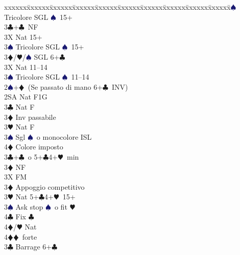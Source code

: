 \documentclass[a4paper,italian]{article}
\newcommand{\BC}{\textcolor{OliveGreen}{$\clubsuit$}}
\newcommand{\BD}{\textcolor{RedOrange}{$\vardiamondsuit$}}
\newcommand{\BH}{\textcolor{Red2}{$\varheartsuit${}}}
\newcommand{\BS}{\textcolor{MidnightBlue}{$\spadesuit${}}}
\newenvironment{bidtable}
{\begin{tabbing}

    xxxxxx\=xxxxxx\=xxxxxx\=xxxxxx\=xxxxxx\=xxxxxx\=xxxxxx\=xxxxxx\=xxxxxx\=xxxxxx\=\kill}
{\end{tabbing} }%
\begin{document}
\begin{multicols}{2}
\begin{bidtable}
                                            3\BS \> Tricolore SGL \BS\ 15+\-\\
                                            3\BC {}+\BC\ NF\+\\
                                            3X \> Nat 15+\\
                                            3\BS \> Tricolore SGL \BS\ 15+\-\\
                                            3\BD/\BH/\BS \> SGL 6+\BC \-\\
                                            3X \> Nat 11--14\\
                                            3\BS \> Tricolore SGL \BS\  11--14\-\\
                                            2\BS {}+\BD\ (Se passato di mano 6+\BC\ INV)\+\\
                                            2SA \> Nat F1G\+\\
                                            3\BC \> Nat F\\
                                            3\BD \> Inv passabile\\
                                            3\BH \> Nat F\\
                                            3\BS \> Sgl \BS\ o monocolore ISL\\
                                            4\BD \> Colore imposto\-\\
                                            3\BC {}+\BC\ o 5+\BC 4+\BH\ min\+\\
                                            3\BD \> NF\\
                                            3X \> FM\-\\
                                            3\BD \> Appoggio competitivo\\
                                            3\BH \> Nat 5+\BC 4+\BH\ 15+\+\\
                                            3\BS \> Ask stop \BS\ o fit \BH \\
                                            4\BC \> Fix \BC \\
                                            4\BD/\BH \> Nat\-\\
                                            4\BD {}\BD\ forte\-\\
                                            3\BC \> Barrage 6+\BC \\

\end{bidtable}
\end{multicols}
\end{document}
